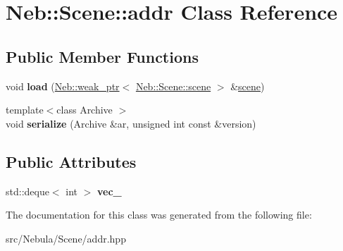 \hypertarget{classNeb_1_1Scene_1_1addr}{\section{\-Neb\-:\-:\-Scene\-:\-:addr \-Class \-Reference}
\label{classNeb_1_1Scene_1_1addr}
}
\subsection*{\-Public \-Member \-Functions}
\begin{DoxyCompactItemize}
\item 
\hypertarget{classNeb_1_1Scene_1_1addr_a08313533ca1c25331502404334be513e}{void {\bfseries load} (\hyperlink{classNeb_1_1weak__ptr}{\-Neb\-::weak\-\_\-ptr}$<$ \hyperlink{classNeb_1_1Scene_1_1scene}{\-Neb\-::\-Scene\-::scene} $>$ \&\hyperlink{classNeb_1_1Scene_1_1scene}{scene})}\label{classNeb_1_1Scene_1_1addr_a08313533ca1c25331502404334be513e}

\item 
\hypertarget{classNeb_1_1Scene_1_1addr_a7b2713d33985723f3992657b67f8ddf1}{{\footnotesize template$<$class Archive $>$ }\\void {\bfseries serialize} (\-Archive \&ar, unsigned int const \&version)}\label{classNeb_1_1Scene_1_1addr_a7b2713d33985723f3992657b67f8ddf1}

\end{DoxyCompactItemize}
\subsection*{\-Public \-Attributes}
\begin{DoxyCompactItemize}
\item 
\hypertarget{classNeb_1_1Scene_1_1addr_a030f81b696ac01ed8fd741694ee2d2ba}{std\-::deque$<$ int $>$ {\bfseries vec\-\_\-}}\label{classNeb_1_1Scene_1_1addr_a030f81b696ac01ed8fd741694ee2d2ba}

\end{DoxyCompactItemize}


\-The documentation for this class was generated from the following file\-:\begin{DoxyCompactItemize}
\item 
src/\-Nebula/\-Scene/addr.\-hpp\end{DoxyCompactItemize}
